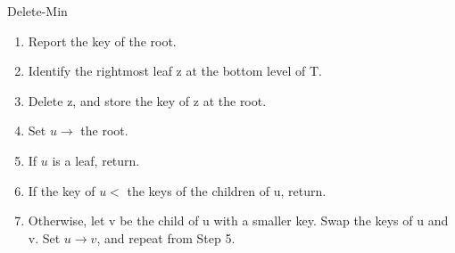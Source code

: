 \documentclass{lecture}
\begin{document}
\begin{landscape}
\begin{multicols}{2}
\begin{note}{Delete-Min}
        \begin{enumerate}[nolistsep]
            \item Report the key of the root.
            \item Identify the rightmost leaf z at the bottom level of T.
            \item Delete z, and store the key of z at the root.
            \item Set $u\rightarrow$ the root.
            \item If $u$ is a leaf, return.
            \item If the key of $u <$ the keys of the children of u, return.
            \item Otherwise, let v be the child of u with a smaller key. Swap the keys of u and v. Set $u\rightarrow v$, and repeat from Step 5.
        \end{enumerate}
    \end{note}

\end{multicols}

\end{landscape}
\end{document}
